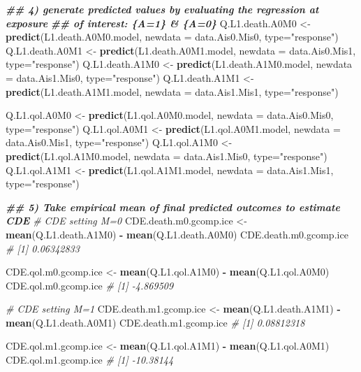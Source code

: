\documentclass[
]{book}
\newenvironment{Shaded}{\begin{snugshade}}{\end{snugshade}}
\newcommand{\AttributeTok}[1]{\textcolor[rgb]{0.13,0.29,0.53}{#1}}
\newcommand{\CommentTok}[1]{\textcolor[rgb]{0.56,0.35,0.01}{\textit{#1}}}
\newcommand{\DocumentationTok}[1]{\textcolor[rgb]{0.56,0.35,0.01}{\textbf{\textit{#1}}}}
\newcommand{\FunctionTok}[1]{\textcolor[rgb]{0.13,0.29,0.53}{\textbf{#1}}}
\newcommand{\NormalTok}[1]{#1}
\newcommand{\OtherTok}[1]{\textcolor[rgb]{0.56,0.35,0.01}{#1}}
\newcommand{\SpecialCharTok}[1]{\textcolor[rgb]{0.81,0.36,0.00}{\textbf{#1}}}
\newcommand{\StringTok}[1]{\textcolor[rgb]{0.31,0.60,0.02}{#1}}
\begin{document}
\begin{Shaded}
\begin{Highlighting}[]
\DocumentationTok{\#\# 4) generate predicted values by evaluating the regression at exposure }
\DocumentationTok{\#\#    of interest: \{A=1\} \& \{A=0\}}
\NormalTok{Q.L1.death.A0M0 }\OtherTok{\textless{}{-}} \FunctionTok{predict}\NormalTok{(L1.death.A0M0.model, }\AttributeTok{newdata =}\NormalTok{ data.Ais0.Mis0, }\AttributeTok{type=}\StringTok{"response"}\NormalTok{)}
\NormalTok{Q.L1.death.A0M1 }\OtherTok{\textless{}{-}} \FunctionTok{predict}\NormalTok{(L1.death.A0M1.model, }\AttributeTok{newdata =}\NormalTok{ data.Ais0.Mis1, }\AttributeTok{type=}\StringTok{"response"}\NormalTok{)}
\NormalTok{Q.L1.death.A1M0 }\OtherTok{\textless{}{-}} \FunctionTok{predict}\NormalTok{(L1.death.A1M0.model, }\AttributeTok{newdata =}\NormalTok{ data.Ais1.Mis0, }\AttributeTok{type=}\StringTok{"response"}\NormalTok{)}
\NormalTok{Q.L1.death.A1M1 }\OtherTok{\textless{}{-}} \FunctionTok{predict}\NormalTok{(L1.death.A1M1.model, }\AttributeTok{newdata =}\NormalTok{ data.Ais1.Mis1, }\AttributeTok{type=}\StringTok{"response"}\NormalTok{)}

\NormalTok{Q.L1.qol.A0M0 }\OtherTok{\textless{}{-}} \FunctionTok{predict}\NormalTok{(L1.qol.A0M0.model, }\AttributeTok{newdata =}\NormalTok{ data.Ais0.Mis0, }\AttributeTok{type=}\StringTok{"response"}\NormalTok{)}
\NormalTok{Q.L1.qol.A0M1 }\OtherTok{\textless{}{-}} \FunctionTok{predict}\NormalTok{(L1.qol.A0M1.model, }\AttributeTok{newdata =}\NormalTok{ data.Ais0.Mis1, }\AttributeTok{type=}\StringTok{"response"}\NormalTok{)}
\NormalTok{Q.L1.qol.A1M0 }\OtherTok{\textless{}{-}} \FunctionTok{predict}\NormalTok{(L1.qol.A1M0.model, }\AttributeTok{newdata =}\NormalTok{ data.Ais1.Mis0, }\AttributeTok{type=}\StringTok{"response"}\NormalTok{)}
\NormalTok{Q.L1.qol.A1M1 }\OtherTok{\textless{}{-}} \FunctionTok{predict}\NormalTok{(L1.qol.A1M1.model, }\AttributeTok{newdata =}\NormalTok{ data.Ais1.Mis1, }\AttributeTok{type=}\StringTok{"response"}\NormalTok{)}

\DocumentationTok{\#\# 5) Take empirical mean of final predicted outcomes to estimate CDE}
\CommentTok{\# CDE setting M=0}
\NormalTok{CDE.death.m0.gcomp.ice }\OtherTok{\textless{}{-}} \FunctionTok{mean}\NormalTok{(Q.L1.death.A1M0) }\SpecialCharTok{{-}} \FunctionTok{mean}\NormalTok{(Q.L1.death.A0M0)}
\NormalTok{CDE.death.m0.gcomp.ice}
\CommentTok{\# [1] 0.06342833}

\NormalTok{CDE.qol.m0.gcomp.ice }\OtherTok{\textless{}{-}} \FunctionTok{mean}\NormalTok{(Q.L1.qol.A1M0) }\SpecialCharTok{{-}} \FunctionTok{mean}\NormalTok{(Q.L1.qol.A0M0)}
\NormalTok{CDE.qol.m0.gcomp.ice}
\CommentTok{\# [1] {-}4.869509}

\CommentTok{\# CDE setting M=1}
\NormalTok{CDE.death.m1.gcomp.ice }\OtherTok{\textless{}{-}} \FunctionTok{mean}\NormalTok{(Q.L1.death.A1M1) }\SpecialCharTok{{-}} \FunctionTok{mean}\NormalTok{(Q.L1.death.A0M1)}
\NormalTok{CDE.death.m1.gcomp.ice}
\CommentTok{\# [1] 0.08812318}

\NormalTok{CDE.qol.m1.gcomp.ice }\OtherTok{\textless{}{-}} \FunctionTok{mean}\NormalTok{(Q.L1.qol.A1M1) }\SpecialCharTok{{-}} \FunctionTok{mean}\NormalTok{(Q.L1.qol.A0M1)}
\NormalTok{CDE.qol.m1.gcomp.ice}
\CommentTok{\# [1] {-}10.38144}
\end{Highlighting}
\end{Shaded}
\end{document}
